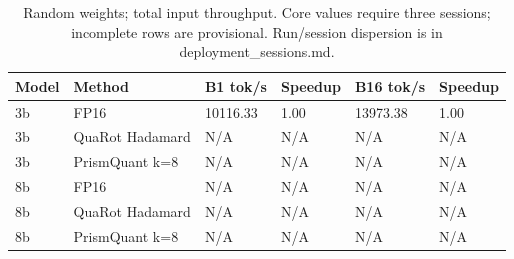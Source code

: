 \begin{table}[t]
\centering
\small
\caption{Random weights; total input throughput. Core values require three sessions; incomplete rows are provisional. Run/session dispersion is in deployment\_sessions.md.}
\begin{tabular}{llllll}
\toprule
Model & Method & B1 tok/s & Speedup & B16 tok/s & Speedup \\
\midrule
3b & FP16 & 10116.33 & 1.00 & 13973.38 & 1.00 \\
3b & QuaRot Hadamard & N/A & N/A & N/A & N/A \\
3b & PrismQuant k=8 & N/A & N/A & N/A & N/A \\
8b & FP16 & N/A & N/A & N/A & N/A \\
8b & QuaRot Hadamard & N/A & N/A & N/A & N/A \\
8b & PrismQuant k=8 & N/A & N/A & N/A & N/A \\
\bottomrule
\end{tabular}
\end{table}
